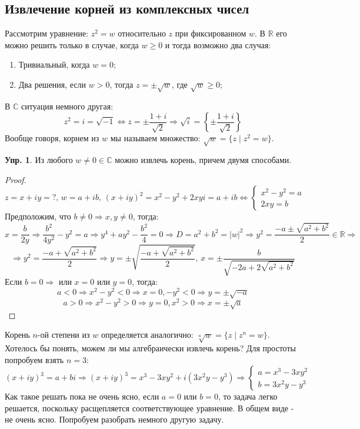\documentclass[12pt]{article}
\newcommand{\MR}{\mathbb{R}}
\newcommand{\MC}{\mathbb{C}}
\theoremstyle{definition}
\newtheorem{exrc}{Упр.}
\begin{document}
\subsection*{Извлечение корней из комплексных чисел}
Рассмотрим уравнение: $z^2 = w$ относительно $z$ при фиксированном $w$. В $\MR$ его можно решить только в случае, когда $w \geq 0$ и тогда возможно два случая:
\begin{enumerate}[label=\arabic*)]
	\item Тривиальный, когда $w = 0$; 
	\item Два решения, если $w > 0$, тогда  $z = \pm \sqrt{w}$, где $\sqrt{w} \geq 0$;
\end{enumerate}
В $\MC$ ситуация немного другая: 
$$
	z^2 = i = \sqrt{-1 } \Leftrightarrow z = \pm \dfrac{1 + i}{\sqrt{2}} \Rightarrow \sqrt{i} = \left\{\pm \dfrac{1 + i}{\sqrt{2}}\right\}
$$
Вообще говоря, корнем из $w$ мы называем множество: $\sqrt{w} = \{z \mid z^2 = w\}$.
\newpage
\begin{exrc}
	Из любого $w \neq 0 \in \MC$ можно извлечь корень, причем двумя способами.
\end{exrc}
\begin{proof}
	$$
		z = x + iy = ?, \, w = a+ ib, \, (x + iy)^2 = x^2 - y^2 + 2xyi = a + ib \Leftrightarrow 
		\begin{cases}
			x^2 - y^2 = a\\
			2xy = b
		\end{cases}
	$$
	Предположим, что $b \neq 0 \Rightarrow x,y \neq 0$, тогда:
	$$
		x = \dfrac{b}{2y} \Rightarrow \dfrac{b^2}{4y^2} - y^2 = a \Rightarrow y^4 + ay^2 - \dfrac{b^2}{4} = 0 \Rightarrow D = a^2 + b^2 = |w|^2 \Rightarrow y^2 = \dfrac{-a \pm \sqrt{a^2 + b^2}}{2} \in \MR \Rightarrow
	$$
	$$
		\Rightarrow y^2 = \dfrac{-a + \sqrt{a^2 + b^2}}{2} \Rightarrow y = \pm \sqrt{\dfrac{-a + \sqrt{a^2 + b^2}}{2}}, \, x = \pm \dfrac{b}{\sqrt{-2a + 2\sqrt{a^2 + b^2}}}
	$$
	Если $b = 0 \Rightarrow$ или $x = 0$ или $y = 0$, тогда:
	$$
		a < 0 \Rightarrow x^2 - y^2 < 0 \Rightarrow x = 0, -y^2 < 0 \Rightarrow y = \pm \sqrt{-a}
	$$
	$$
		a > 0 \Rightarrow x^2 - y^2 > 0 \Rightarrow  y = 0, x^2 > 0 \Rightarrow x = \pm \sqrt{a}
	$$
\end{proof}
Корень $n$-ой степени из $w$ определяется аналогично: $\sqrt[n]{w} = \{z \mid z^n = w\}$. Хотелось бы понять, можем ли мы алгебраически извлечь корень? Для простоты попробуем взять $n = 3$:
$$
	(x + iy)^3 = a + bi \Rightarrow (x + iy)^3 =  x^3 - 3xy^2 + i(3x^2y -y^3) \Rightarrow
	\begin{cases}
		a = x^3 - 3xy^2\\
		b = 3x^2y -y^3
	\end{cases}
$$
Как такое решать пока не очень ясно, если $a = 0$ или $b = 0$, то задача легко решается, поскольку расщепляется соответствующее уравнение. В общем виде - не очень ясно. Попробуем разобрать немного другую задачу.
\end{document}
